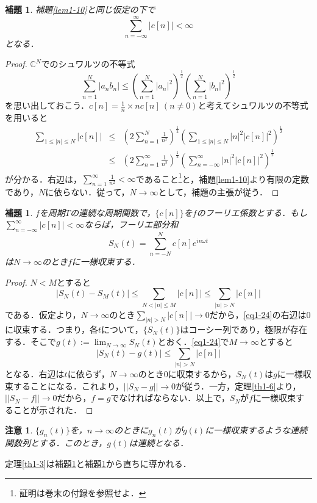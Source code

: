 \documentclass[a4j]{jsbook}
\newtheorem{lemma}[theorem]{補題}
\newtheorem{rem}[theorem]{注意}
\numberwithin{theorem}{chapter}  %
\begin{document}
\begin{lemma}
\label{lem1-11}
補題\ref{lem1-10}と同じ仮定の下で
\begin{equation*}
    \sum_{n=-\infty}^\infty |c[n]|<\infty
\end{equation*}
となる．
\end{lemma}
\begin{proof}
\(\mathbb{C}^N\)でのシュワルツの不等式
\begin{equation*}
    \sum_{n=1}^N |a_nb_n|\leq\left(\sum_{n=1}^N |a_n|^2\right)^\frac{1}{2}\left(\sum_{n=1}^N |b_n|^2\right)^\frac{1}{2}
\end{equation*}
を思い出しておこう．\(\displaystyle c[n]=\frac{1}{n}\times nc[n]\ (n\neq 0)\)と考えてシュワルツの不等式を用いると
\begin{eqnarray*}
\sum_{1\leq|n|\leq N}|c[n]|&\leq&\left(2\sum_{n=1}^N\frac{1}{n^2}\right)^{\frac{1}{2}}\left(\sum_{1\leq|n|\leq N}|n|^2|c[n]|^2\right)^{\frac{1}{2}} \\
&\leq&\left(2\sum_{n=1}^\infty\frac{1}{n^2}\right)^{\frac{1}{2}}\left(\sum_{n=-\infty}^\infty|n|^2|c[n]|^2\right)^{\frac{1}{2}}
\end{eqnarray*}
が分かる．右辺は，\(\displaystyle \sum_{n=1}^\infty\frac{1}{n^2}<\infty\)であること\footnote{証明は巻末の付録を参照せよ．}と，補題\ref{lem1-10}より有限の定数であり，\(N\)に依らない．従って，\(N\to\infty\)として，補題の主張が従う．
\end{proof}
\begin{lemma}
\label{lem1-12}
\(f\)を周期\(T\)の連続な周期関数で，\(\{c[n]\}\)を\(f\)のフーリエ係数とする．もし\(\displaystyle \sum_{n=-\infty}^\infty |c[n]|<\infty\)ならば，フーリエ部分和
\begin{equation*}
    S_N(t)=\sum_{n=-N}^N c[n]e^{in\omega t}
\end{equation*}
は\(N\to\infty\)のとき\(f\)に一様収束する．
\end{lemma}
\begin{proof}
\(N<M\)とすると
\begin{equation}
    |S_N(t)-S_M(t)|\leq\sum_{N<|n|\leq M}|c[n]|\leq\sum_{|n|>N}|c[n]| \label{eq1-24}
\end{equation}
である．仮定より，\(N\to\infty\)のとき\(\displaystyle \sum_{|n|>N}|c[n]|\to 0\)だから，\eqref{eq1-24}の右辺は0に収束する．つまり，各\(t\)について，\(\{S_N(t)\}\)はコーシー列であり，極限が存在する．そこで\(\displaystyle g(t):=\lim_{N\to\infty} S_N(t)\)とおく．\eqref{eq1-24}で\(M\to\infty\)とすると
\begin{equation*}
    |S_N(t)-g(t)|\leq\sum_{|n|>N}|c[n]|
\end{equation*}
となる．右辺は\(t\)に依らず，\(N\to\infty\)のとき0に収束するから，\(S_N(t)\)は\(g\)に一様収束することになる．これより，\(||S_N-g||\to 0\)が従う．一方，定理\ref{th1-6}より，\(||S_N-f||\to 0\)だから，\(f=g\)でなければならない．以上で，\(S_N\)が\(f\)に一様収束することが示された．
\end{proof}
\begin{rem}
\label{rem1-2}
\(\{g_n(t)\}\)を，\(n\to\infty\)のときに\(g_n(t)\)が\(g(t)\)に一様収束するような連続関数列とする．このとき，\(g(t)\)は連続となる．
\end{rem}
定理\ref{th1-3}は補題\ref{lem1-11}と補題\ref{lem1-12}から直ちに導かれる．
\end{document}
